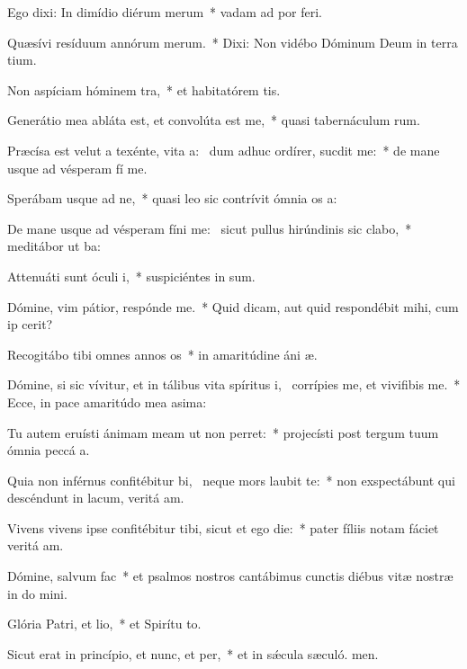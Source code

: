 \item Ego dixi: In dimídio diérum merum~* vadam ad por feri.
\item Quæsívi resíduum annórum merum.~* Dixi: Non vidébo Dóminum Deum in terra tium.
\item Non aspíciam hóminem tra,~* et habitatórem tis.
\item Generátio mea abláta est, et convolúta est  me,~* quasi tabernáculum rum.
\item Præcísa est velut a texénte, vita a:~\pscross{} dum adhuc ordírer, sucdit me:~* de mane usque ad vésperam fí me.
\item Sperábam usque ad ne,~* quasi leo sic contrívit ómnia os a:
\item De mane usque ad vésperam fíni me:~\pscross{} sicut pullus hirúndinis sic clabo,~* meditábor ut ba:
\item Attenuáti sunt óculi i,~* suspiciéntes in sum.
\item Dómine, vim pátior, respónde  me.~* Quid dicam, aut quid respondébit mihi, cum ip cerit?
\item Recogitábo tibi omnes annos os~* in amaritúdine áni æ.
\item Dómine, si sic vívitur, et in tálibus vita spíritus i,~\pscross{} corrípies me, et vivifibis me.~* Ecce, in pace amaritúdo mea asima:
\item Tu autem eruísti ánimam meam ut non perret:~* projecísti post tergum tuum ómnia peccá a.
\item Quia non inférnus confitébitur bi,~\pscross{} neque mors laubit te:~* non exspectábunt qui descéndunt in lacum, veritá am.
\item Vivens vivens ipse confitébitur tibi, sicut et ego die:~* pater fíliis notam fáciet veritá am.
\item Dómine, salvum  fac~* et psalmos nostros cantábimus cunctis diébus vitæ nostræ in do mini.
\item Glória Patri, et lio,~* et Spirítu to.
\item Sicut erat in princípio, et nunc, et per,~* et in sǽcula sæculó. men.
